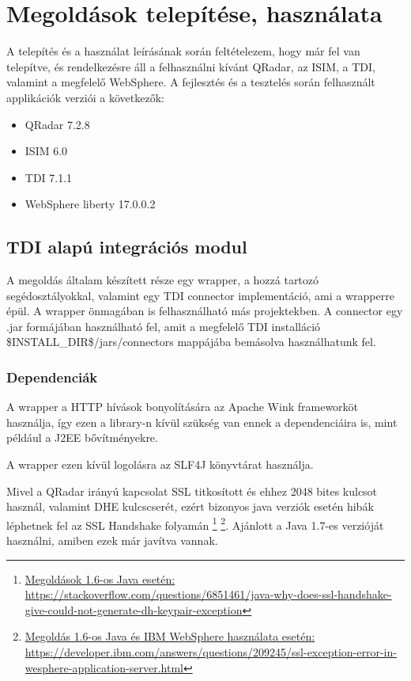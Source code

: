 \chapter{Megoldások telepítése, használata} \label{ch:usage}
A telepítés és a használat leírásának során feltételezem, hogy már fel van telepítve, és rendelkezésre áll a felhasználni kívánt QRadar, az ISIM, a TDI, valamint a megfelelő WebSphere. A fejlesztés és a tesztelés során felhasznált applikációk verziói a következők:

\begin{itemize}
	\item QRadar 7.2.8
	\item ISIM 6.0
	\item TDI 7.1.1
	\item WebSphere liberty 17.0.0.2
\end{itemize}



\section{TDI alapú integrációs modul}
A megoldás általam készített része egy wrapper, a hozzá tartozó segédosztályokkal, valamint egy TDI connector implementáció, ami a wrapperre épül. A wrapper önmagában is felhasználható más projektekben. A connector egy .jar formájában használható fel, amit a megfelelő TDI installáció \$INSTALL\_DIR\$/jars/connectors mappájába bemásolva használhatunk fel. 
\subsection{Dependenciák} \label{subsec:wrapdep}
A wrapper a HTTP hívások bonyolítására az Apache Wink\cite{wink} frameworköt használja, így ezen a library-n kívül szükség van ennek a dependenciáira is, mint például a J2EE bővítményekre.

A wrapper ezen kívül logolásra az SLF4J könyvtárat használja.\cite{slf4j}

Mivel a QRadar irányú kapcsolat SSL titkosított és ehhez 2048 bites kulcsot használ, valamint DHE kulcscserét, ezért bizonyos java verziók esetén hibák léphetnek fel az SSL Handshake folyamán
\footnote{\href{https://stackoverflow.com/questions/6851461/java-why-does-ssl-handshake-give-could-not-generate-dh-keypair-exception}{Megoldások 1.6-os Java esetén: https://stackoverflow.com/questions/6851461/java-why-does-ssl-handshake-give-could-not-generate-dh-keypair-exception}} \footnote{\href{https://developer.ibm.com/answers/questions/209245/ssl-exception-error-in-wesphere-application-server.html}{Megoldás 1.6-os Java és IBM WebSphere használata esetén: https://developer.ibm.com/answers/questions/209245/ssl-exception-error-in-wesphere-application-server.html}}.
Ajánlott a Java 1.7-es verzióját használni, amiben ezek már javítva vannak.
